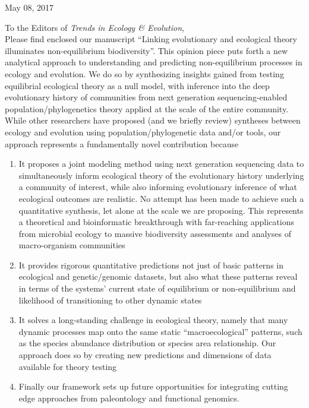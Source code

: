 \documentclass[12pt]{article}
\begin{document}
\thispagestyle{empty}

\noindent
May 08, 2017
\vspace{2em}

\noindent
To the Editors of {\it Trends in Ecology \& Evolution},
\\

Please find enclosed our manuscript ``Linking evolutionary and
ecological theory illuminates non-equilibrium biodiversity''. This
opinion piece puts forth a new analytical approach to understanding
and predicting non-equilibrium processes in ecology and evolution. We
do so by synthesizing insights gained from testing equilibrial
ecological theory as a null model, with inference into the deep
evolutionary history of communities from next generation
sequencing-enabled population/phylogenetics theory applied at the
scale of the entire community. While other researchers have proposed
(and we briefly review) syntheses between ecology and evolution using
population/phylogenetic data and/or tools, our approach represents a
fundamentally novel contribution because

\begin{enumerate}
\item It proposes a joint modeling method using next generation
  sequencing data to simultaneously inform ecological theory of the
  evolutionary history underlying a community of interest, while also
  informing evolutionary inference of what ecological outcomes are
  realistic. No attempt has been made to achieve such a quantitative
  synthesis, let alone at the scale we are proposing. This represents
  a theoretical and bioinformatic breakthrough with far-reaching
  applications from microbial ecology to massive biodiversity
  assessments and analyses of macro-organism communities
\item It provides rigorous quantitative predictions not just of basic
  patterns in ecological and genetic/genomic datasets, but also what
  these patterns reveal in terms of the systems' current state of
  equilibrium or non-equilibrium and likelihood of transitioning to
  other dynamic states
\item It solves a long-standing challenge in ecological theory, namely
  that many dynamic processes map onto the same static
  ``macroecological'' patterns, such as the species abundance
  distribution or species area relationship. Our approach does so by
  creating new predictions and dimensions of data available for theory
  testing
\item Finally our framework sets up future opportunities for
  integrating cutting edge approaches from paleontology and functional
  genomics.
\end{enumerate}
\end{document}
